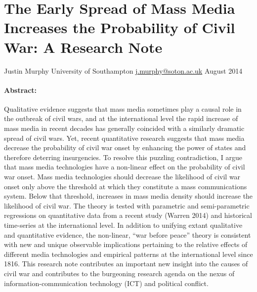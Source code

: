 \documentclass[11pt,article,oneside]{memoir}
\author{}
\date{}
\begin{document}
  
\setsansfont[Mapping=tex-text]{Gill Sans} 
\setmonofont[Mapping=tex-text,Scale=0.8]{Consolas}
\pagestyle{kjh}

\singlespacing





\thispagestyle{empty}

\section{The Early Spread of Mass Media Increases the Probability of
Civil War: A Research
Note}\label{the-early-spread-of-mass-media-increases-the-probability-of-civil-war-a-research-note}

Justin Murphy \newline
University of Southampton \newline     
\href{mailto:j.murphy@soton.ac.uk}{j.murphy@soton.ac.uk} \newline    
August 2014 \newline        

\paragraph{Abstract:}\label{abstract}

Qualitative evidence suggests that mass media sometimes play a causal
role in the outbreak of civil wars, and at the international level the
rapid increase of mass media in recent decades has generally coincided
with a similarly dramatic spread of civil wars. Yet, recent quantitative
research suggests that mass media decrease the probability of civil war
onset by enhancing the power of states and therefore deterring
insurgencies. To resolve this puzzling contradiction, I argue that mass
media technologies have a non-linear effect on the probability of civil
war onset. Mass media technologies should decrease the likelihood of
civil war onset only above the threshold at which they constitute a mass
communications system. Below that threshold, increases in mass media
density should increase the likelihood of civil war. The theory is
tested with parametric and semi-parametric regressions on quantitative
data from a recent study (Warren 2014) and historical time-series at the
international level. In addition to unifying extant qualitative and
quantitative evidence, the non-linear, ``war before peace'' theory is
consistent with new and unique observable implications pertaining to the
relative effects of different media technologies and empirical patterns
at the international level since 1816. This research note contributes an
important new insight into the causes of civil war and contributes to
the burgeoning research agenda on the nexus of information-communication
technology (ICT) and political conflict.
\end{document}
